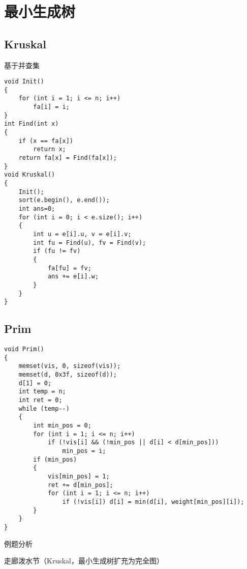 \section{最小生成树}
\subsection{Kruskal}
基于并查集
\begin{lstlisting}
void Init()
{
    for (int i = 1; i <= n; i++)
        fa[i] = i;
}
int Find(int x)
{
    if (x == fa[x])
        return x;
    return fa[x] = Find(fa[x]);
}
void Kruskal()
{
    Init();
    sort(e.begin(), e.end());
    int ans=0;
    for (int i = 0; i < e.size(); i++)
    {
        int u = e[i].u, v = e[i].v;
        int fu = Find(u), fv = Find(v);
        if (fu != fv)
        {
            fa[fu] = fv;
            ans += e[i].w;
        }
    }
}
\end{lstlisting}
\subsection{Prim}
\begin{lstlisting}
void Prim()
{
    memset(vis, 0, sizeof(vis));
    memset(d, 0x3f, sizeof(d));
    d[1] = 0;
    int temp = n;
    int ret = 0;
    while (temp--)
    {
        int min_pos = 0;
        for (int i = 1; i <= n; i++)
            if (!vis[i] && (!min_pos || d[i] < d[min_pos]))
                min_pos = i;
        if (min_pos)
        {
            vis[min_pos] = 1;
            ret += d[min_pos];
            for (int i = 1; i <= n; i++)
                if (!vis[i]) d[i] = min(d[i], weight[min_pos][i]);
        }
    }
}
\end{lstlisting}
例题分析

走廊泼水节（Kruskal，最小生成树扩充为完全图）

